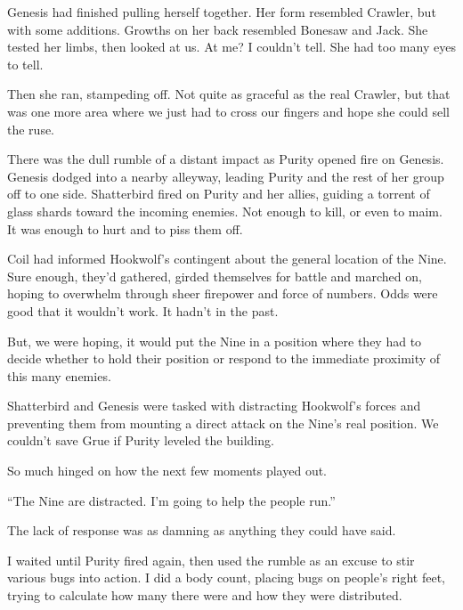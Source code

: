 Genesis had finished pulling herself together.  Her form resembled Crawler, but with some additions.  Growths on her back resembled Bonesaw and Jack.  She tested her limbs, then looked at us.  At me?  I couldn't tell.  She had too many eyes to tell.



Then she ran, stampeding off.  Not quite as graceful as the real Crawler, but that was one more area where we just had to cross our fingers and hope she could sell the ruse.



There was the dull rumble of a distant impact as Purity opened fire on Genesis.  Genesis dodged into a nearby alleyway, leading Purity and the rest of her group off to one side.  Shatterbird fired on Purity and her allies, guiding a torrent of glass shards toward the incoming enemies.  Not enough to kill, or even to maim.  It was enough to hurt and to piss them off.



Coil had informed Hookwolf's contingent about the general location of the Nine.  Sure enough, they'd gathered, girded themselves for battle and marched on, hoping to overwhelm through sheer firepower and force of numbers.  Odds were good that it wouldn't work.  It hadn't in the past.



But, we were hoping, it would put the Nine in a position where they had to decide whether to hold their position or respond to the immediate proximity of this many enemies.



Shatterbird and Genesis were tasked with distracting Hookwolf's forces and preventing them from mounting a direct attack on the Nine's real position.  We couldn't save Grue if Purity leveled the building.



So much hinged on how the next few moments played out.



``The Nine are distracted.  I'm going to help the people run.''



The lack of response was as damning as anything they could have said.



I waited until Purity fired again, then used the rumble as an excuse to stir various bugs into action.  I did a body count, placing bugs on people's right feet, trying to calculate how many there were and how they were distributed.



